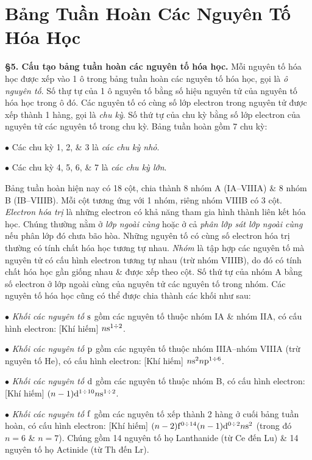 \documentclass{article}
\numberwithin{equation}{section}
\begin{document}
\section{Bảng Tuần Hoàn Các Nguyên Tố Hóa Học}
\textbf{\S5. Cấu tạo bảng tuần hoàn các nguyên tố hóa học.} Mỗi nguyên tố hóa học được xếp vào 1 ô trong bảng tuần hoàn các nguyên tố hóa học, gọi là \textit{ô nguyên tố}. Số thự tự của 1 ô nguyên tố bằng số hiệu nguyên tử của nguyên tố hóa học trong ô đó. Các nguyên tố có cùng số lớp electron trong nguyên tử được xếp thành 1 hàng, gọi là \textit{chu kỳ}. Số thứ tự của chu kỳ bằng số lớp electron của nguyên tử các nguyên tố trong chu kỳ. Bảng tuần hoàn gồm 7 chu kỳ: 
\begin{enumerate*}
	\item[$\bullet$] Các chu kỳ 1, 2, \& 3 là \textit{các chu kỳ nhỏ}.
	\item[$\bullet$] Các chu kỳ 4, 5, 6, \& 7 là \textit{các chu kỳ lớn}.
\end{enumerate*}
Bảng tuần hoàn hiện nay có 18 cột, chia thành 8 nhóm A (IA--VIIIA) \& 8 nhóm B (IB--VIIIB). Mỗi cột tương ứng với 1 nhóm, riêng nhóm VIIIB có 3 cột. \textit{Electron hóa trị} là những electron có khả năng tham gia hình thành liên kết hóa học. Chúng thường nằm ở \textit{lớp ngoài cùng} hoặc ở cả \textit{phân lớp sát lớp ngoài cùng} nếu phân lớp đó chưa bão hòa. Những nguyên tố có cùng số electron hóa trị thường có tính chất hóa học tương tự nhau. \textit{Nhóm} là tập hợp các nguyên tố mà nguyên tử có cấu hình electron tương tự nhau (trừ nhóm VIIIB), do đó có tính chất hóa học gần giống nhau \& được xếp theo cột. Số thứ tự của nhóm A bằng số electron ở lớp ngoài cùng của nguyên tử các nguyên tố trong nhóm. Các nguyên tố hóa học cũng có thể được chia thành các khối như sau:
\begin{enumerate*}
	\item[$\bullet$] \textit{Khối các nguyên tố $\rm s$} gồm các nguyên tố thuộc nhóm IA \& nhóm IIA, có cấu hình electron: [Khí hiếm] $n{\rm s}^{1\div 2}$.
	\item[$\bullet$] \textit{Khối các nguyên tố $\rm p$} gồm các nguyên tố thuộc nhóm IIIA--nhóm VIIIA (trừ nguyên tố He), có cấu hình electron: [Khí hiếm] $n{\rm s}^2n{\rm p}^{1\div 6}$.
	\item[$\bullet$] \textit{Khối các nguyên tố $\rm d$} gồm các nguyên tố thuộc nhóm B, có cấu hình electron: [Khí hiếm] $(n - 1){\rm d}^{1\div 10}n{\rm s}^{1\div 2}$.
	\item[$\bullet$] \textit{Khối các nguyên tố $\rm f$} gồm các nguyên tố xếp thành 2 hàng ở cuối bảng tuần hoàn, có cấu hình electron: [Khí hiếm] $(n - 2){\rm f}^{0\div 14}(n - 1){\rm d}^{0\div 2}n{\rm s}^2$ (trong đó $n = 6$  \& $n = 7$). Chúng gồm 14 nguyên tố họ Lanthanide (từ Ce đến Lu) \& 14 nguyên tố họ Actinide (từ Th đến Lr).
\end{enumerate*}
\end{document}
